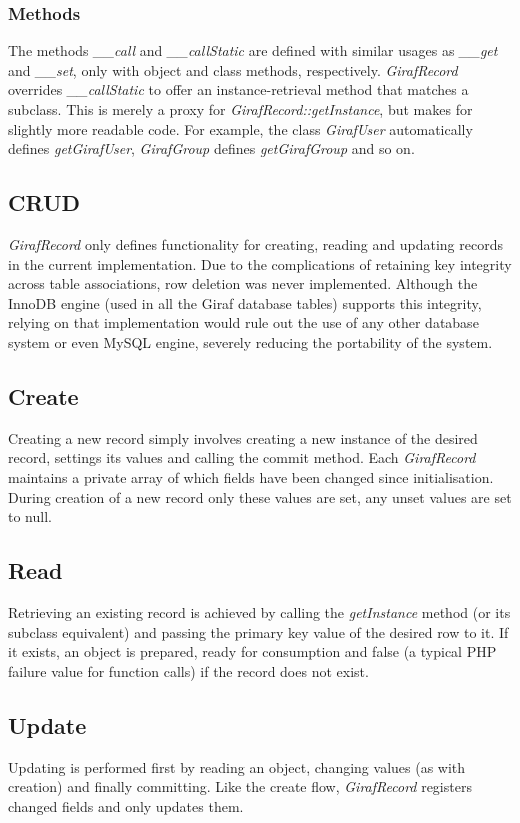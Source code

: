 \subsubsection*{Methods}
The methods \emph{\_\_call} and \emph{\_\_callStatic} are defined with similar usages as \emph{\_\_get} and \emph{\_\_set}, only with object and class methods, respectively. \emph{GirafRecord} overrides \emph{\_\_callStatic} to offer an instance-retrieval method that matches a subclass. This is merely a proxy for \emph{GirafRecord::getInstance}, but makes for slightly more readable code. For example, the class \emph{GirafUser} automatically defines \emph{getGirafUser}, \emph{GirafGroup} defines \emph{getGirafGroup} and so on.

\subsection{CRUD}
\emph{GirafRecord} only defines functionality for creating, reading and updating records in the current implementation. Due to the complications of retaining key integrity across table associations, row deletion was never implemented. Although the InnoDB engine (used in all the Giraf database tables) supports this integrity, relying on that implementation would rule out the use of any other database system or even MySQL engine, severely reducing the portability of the system.

\subsection*{Create}
Creating a new record simply involves creating a new instance of the desired record, settings its values and calling the commit method. Each \emph{GirafRecord} maintains a private array of which fields have been changed since initialisation. During creation of a new record only these values are set, any unset values are set to null.

\subsection*{Read}
Retrieving an existing record is achieved by calling the \emph{getInstance} method (or its subclass equivalent) and passing the primary key value of the desired row to it. If it exists, an object is prepared, ready for consumption and false (a typical PHP failure value for function calls) if the record does not exist.

\subsection*{Update}
Updating is performed first by reading an object, changing values (as with creation) and finally committing. Like the create flow, \emph{GirafRecord} registers changed fields and only updates them.

